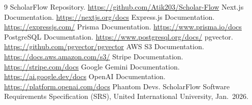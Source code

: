 \begin{thebibliography}{9}
 ScholarFlow Repository.
  \url{https://github.com/Atik203/Scholar-Flow}
 Next.js Documentation. \url{https://nextjs.org/docs}
 Express.js Documentation. \url{https://expressjs.com/}
 Prisma Documentation. \url{https://www.prisma.io/docs}
 PostgreSQL Documentation. \url{https://www.postgresql.org/docs/}
 pgvector. \url{https://github.com/pgvector/pgvector}
 AWS S3 Documentation. \url{https://docs.aws.amazon.com/s3/}
 Stripe Documentation. \url{https://stripe.com/docs}
 Google Gemini Documentation. \url{https://ai.google.dev/docs}
 OpenAI Documentation. \url{https://platform.openai.com/docs}
 Phantom Devs. ScholarFlow Software Requirements Specification (SRS),
  United International University, Jan.\ 2026.
\end{thebibliography}
